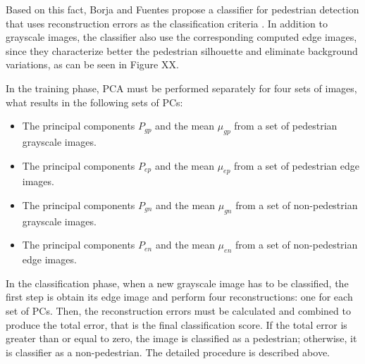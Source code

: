 \documentclass[10pt, conference, compsocconf]{IEEEtran}
\begin{document}
Based on this fact, Borja and Fuentes propose a classifier for pedestrian detection that uses reconstruction errors as the classification criteria \cite{borja09}. In addition to grayscale images, the classifier also use the corresponding computed edge images, since they characterize better the pedestrian silhouette and eliminate background variations, as can be seen in Figure XX. 

In the training phase, PCA must be performed separately for four sets of images, what results in the following sets of PCs:

\begin{itemize}
	\item The principal components $P_{gp}$ and the mean $\mu_{gp}$ from a set of pedestrian grayscale images.
	\item The principal components $P_{ep}$ and the mean $\mu_{ep}$ from a set of pedestrian edge images.
	\item The principal components $P_{gn}$ and the mean $\mu_{gn}$ from a set of non-pedestrian grayscale images.
	\item The principal components $P_{en}$ and the mean $\mu_{en}$ from a set of non-pedestrian edge images.
\end{itemize}

In the classification phase, when a new grayscale image has to be classified, the first step is obtain its edge image and perform four reconstructions: one for each set of PCs. Then, the reconstruction errors must be calculated and combined to produce the total error, that is the final classification score. If the total error is greater than or equal to zero, the image is classified as a pedestrian; otherwise, it is classifier as a non-pedestrian. The detailed procedure is described above.
\end{document}
